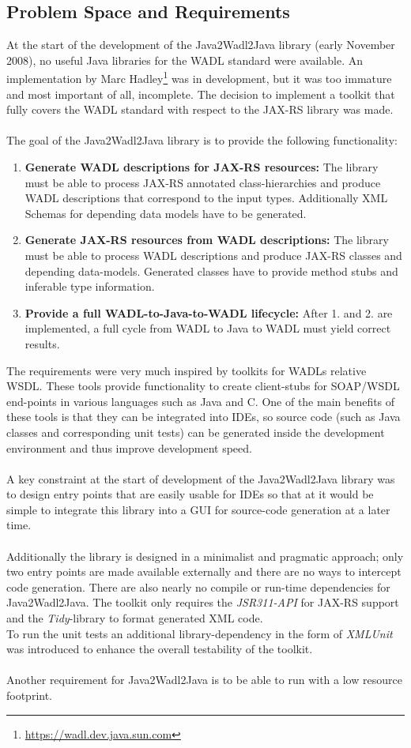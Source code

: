 \subsection{Problem Space and Requirements}

At the start of the development of the Java2Wadl2Java library (early November 2008), no useful Java libraries for the WADL standard were available. An implementation by Marc Hadley\footnote{\url{https://wadl.dev.java.sun.com}} was in development, but it was too immature and most important of all, incomplete. The decision to implement a toolkit that fully covers the WADL standard with respect to the JAX-RS library was made.
\\ \\
The goal of the Java2Wadl2Java library is to provide the following functionality:
\begin{enumerate}
\item{{\bf Generate WADL descriptions for JAX-RS resources:} 
The library must be able to process JAX-RS annotated class-hierarchies and produce WADL descriptions that correspond to the input types. Additionally XML Schemas for depending data models have to be generated.} 
\item{{\bf Generate JAX-RS resources from WADL descriptions:}
The library must be able to process WADL descriptions and produce JAX-RS classes and depending data-models. Generated classes have to provide method stubs and inferable type information.}
\item{{\bf Provide a full WADL-to-Java-to-WADL lifecycle:}
After 1. and 2. are implemented, a full cycle from WADL to Java to WADL must yield correct results.}
\end{enumerate}
The requirements were very much inspired by toolkits for WADLs relative WSDL. These tools provide functionality to create client-stubs for SOAP/WSDL end-points in various languages such as Java and C. One of the main benefits of these tools is that they can be integrated into IDEs, so source code (such as Java classes and corresponding unit tests) can be generated inside the development environment and thus improve development speed.
\\ \\
A key constraint at the start of development of the Java2Wadl2Java library was to design entry points that are easily usable for IDEs so that at it would be simple to integrate this library into a GUI for source-code generation at a later time.
\\ \\
Additionally the library is designed in a minimalist and pragmatic approach; only two entry points are made available externally and there are no ways to intercept code generation. There are also nearly no compile or run-time dependencies for Java2Wadl2Java. The toolkit only requires the \emph{JSR311-API} for JAX-RS support and the \emph{Tidy}-library to format generated XML code.
\\
To run the unit tests an additional library-dependency in the form of \emph{XMLUnit} was introduced to enhance the overall testability of the toolkit.
\\ \\
Another requirement for Java2Wadl2Java is to be able to run with a low resource footprint.